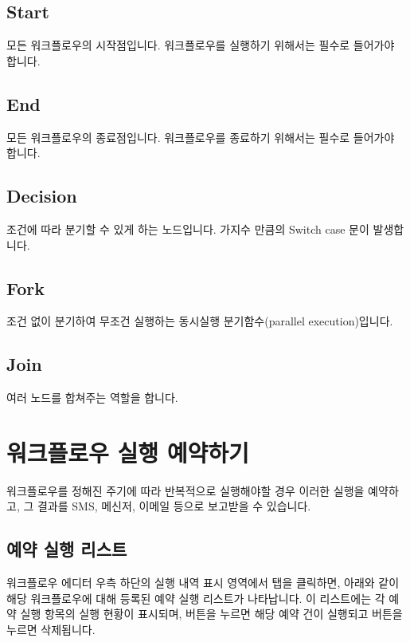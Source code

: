 \documentclass[letterpaper,10pt,english]{sphinxmanual}
\begin{document}
\subsection{Start}
\label{\detokenize{integrator/part03/control_flow:start}}
모든 워크플로우의 시작점입니다. 워크플로우를 실행하기 위해서는 필수로 들어가야 합니다.


\subsection{End}
\label{\detokenize{integrator/part03/control_flow:end}}
모든 워크플로우의 종료점입니다. 워크플로우를 종료하기 위해서는 필수로 들어가야 합니다.


\subsection{Decision}
\label{\detokenize{integrator/part03/control_flow:decision}}
조건에 따라 분기할 수 있게 하는 노드입니다. 가지수 만큼의 Switch case 문이 발생합니다.


\subsection{Fork}
\label{\detokenize{integrator/part03/control_flow:fork}}
조건 없이 분기하여 무조건 실행하는 동시실행 분기함수(parallel execution)입니다.


\subsection{Join}
\label{\detokenize{integrator/part03/control_flow:join}}
여러 노드를 합쳐주는 역할을 합니다.


\section{워크플로우 실행 예약하기}
\label{\detokenize{integrator/part03/scheduled_run:scheduled-run}}\label{\detokenize{integrator/part03/scheduled_run:id1}}\label{\detokenize{integrator/part03/scheduled_run::doc}}
워크플로우를 정해진 주기에 따라 반복적으로 실행해야할 경우 이러한 실행을 예약하고, 그 결과를 SMS, 메신저, 이메일 등으로 보고받을 수 있습니다.


\subsection{예약 실행 리스트}
\label{\detokenize{integrator/part03/scheduled_run:id2}}
워크플로우 에디터 우측 하단의 실행 내역 표시 영역에서  탭을 클릭하면, 아래와 같이 해당 워크플로우에 대해 등록된 예약 실행 리스트가 나타납니다.
이 리스트에는 각 예약 실행 항목의 실행 현황이 표시되며,  버튼을 누르면 해당 예약 건이 실행되고  버튼을 누르면 삭제됩니다.
\begin{quote}

\begin{figure}[H]
\centering

\noindent{}
\end{figure}
\end{quote}
\end{document}
